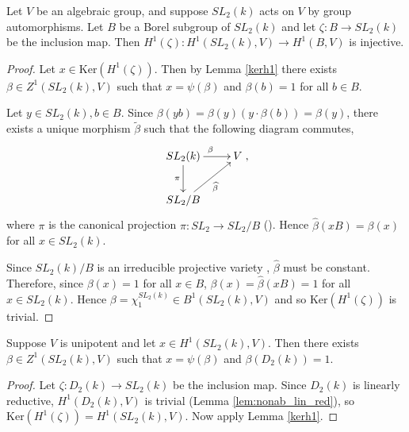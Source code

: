 \begin{lemma} Let $V$ be an algebraic group, and suppose $SL_2(k)$ acts on $V$ by group automorphisms. Let $B$ be a Borel subgroup of $SL_2(k)$ and let $\zeta: B \rightarrow SL_2(k)$ be the inclusion map. Then $H^1(\zeta): H^1(SL_2(k), V)\rightarrow H^1(B, V)$ is injective.
  \label{sl2_b_inj}
\end{lemma}
\begin{proof}
Let $x \in \mathrm{Ker}\left(H^1(\zeta)\right)$. Then by Lemma \ref{kerh1} there exists $\beta \in Z^1(SL_2(k), V)$ such that $x = \psi(\beta)$ and $\beta(b) = 1$ for all $b \in B$.

Let $y\in SL_2(k), b \in B$. Since $\beta(yb) = \beta(y)(y\cdot \beta(b)) = \beta(y)$, there exists a unique morphism $\widetilde{\beta}$ such that the following diagram commutes,
\begin{align*}
	\xymatrix{
	SL_2(k) \ar[r]^{\beta} \ar[d]_{\pi} & V\\
	SL_2/B \ar[ru]_{\widehat{\beta}}
	},
\end{align*}
where $\pi$ is the canonical projection $\pi:SL_2 \rightarrow SL_2/B$ (\cite[TODO]{humphreys1975linear}). Hence $\widehat{\beta}(xB) = \beta(x)$ for all $x \in SL_2(k)$.

Since $SL_2(k)/B$ is an irreducible projective variety \cite[Theorem 21.3]{humphreys1975linear}, $\widehat{\beta}$ must be constant. Therefore, since $\beta(x) = 1$ for all $x \in B$, $\beta(x) = \widehat{\beta}(xB) = 1$ for all $x \in SL_2(k)$. Hence $\beta = \chi^{SL_2(k)}_1 \in B^1(SL_2(k), V)$ and so $\mathrm{Ker}\left(H^1(\zeta)\right)$ is trivial.
\end{proof} 

\begin{lemma}\label{trivial_on_t} Suppose $V$ is unipotent and let $x \in H^1(SL_2(k), V)$. Then there exists $\beta \in Z^1(SL_2(k), V)$ such that $x = \psi(\beta)$ and $\beta\left(D_2(k)\right) = 1$.
\end{lemma}
\begin{proof}
	Let $\zeta:D_2(k) \rightarrow SL_2(k)$ be the inclusion map. Since $D_2(k)$ is linearly reductive, $H^1(D_2(k), V)$ is trivial (Lemma \ref{lem:nonab_lin_red}), so $\mathrm{Ker}\left(H^1(\zeta)\right) = H^1(SL_2(k), V)$. Now apply Lemma \ref{kerh1}.
\end{proof}
